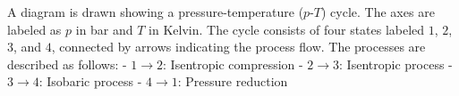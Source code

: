 A diagram is drawn showing a pressure-temperature (\( p \)-\( T \)) cycle. The axes are labeled as \( p \) in bar and \( T \) in Kelvin. The cycle consists of four states labeled \( 1 \), \( 2 \), \( 3 \), and \( 4 \), connected by arrows indicating the process flow. The processes are described as follows:  
- \( 1 \to 2 \): Isentropic compression  
- \( 2 \to 3 \): Isentropic process  
- \( 3 \to 4 \): Isobaric process  
- \( 4 \to 1 \): Pressure reduction